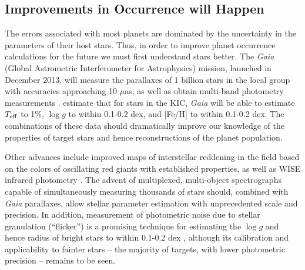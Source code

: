 \subsection{Improvements in Occurrence will Happen}
\label{sec:improvements}
The errors associated with most \kep{} planets are dominated by
the uncertainty in the parameters of their host stars. Thus, in 
order to improve planet occurrence calculations for the future we 
must first understand \kep{} stars better. 
The {\it Gaia} (Global Astrometric Interferometer for Astrophysics)
mission, launched in December 2013, will measure the parallaxes of 1
billion stars in the local group with accuracies approaching 10
$\mu$as, as well as obtain multi-band photometry measurements
\citep{deBruijne2012}. \citet{Liu2012} estimate that for stars in the
KIC, {\it Gaia} will be able to estimate $T_{\rm eff}$ to 1\%, $\log
g$ to within 0.1-0.2 dex, and [Fe/H] to within 0.1-0.2 dex.  The
combinations of these data should dramatically improve our knowledge
of the properties of \kep{} target stars and hence reconstructions of
the \kep{} planet population.

Other advances include improved maps of interstellar reddening in the
\kep{} field based on the colors of oscillating red giants with
established properties, as well as WISE infrared photometry
\citep{Huber2014}.  The advent of multiplexed, multi-object
spectrographs capable of simultaneously measuring thousands of stars
\citep{Hill2010} should, combined with {\it Gaia} parallaxes, allow
stellar parameter estimation with unprecedented
scale and precision. In addition, measurement of photometric noise due
to stellar granulation (``flicker'') is a promising technique for
estimating the $\log g$ and hence radius of bright \kep{} stars to
within 0.1-0.2 dex \citep{Bastien2014}, although its calibration
and applicability to fainter \kep{} stars -- the majority of targets,
with lower photometric precision -- remains to be seen.


